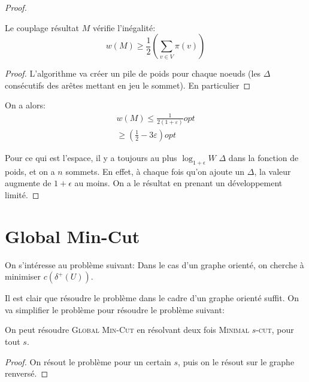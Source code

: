 \documentclass[math, info]{cours}
\begin{document}
\begin{proof}
	\begin{lemme}
		Le couplage résultat $M$ vérifie l'inégalité:
		\begin{equation*}
			w(M) \geq \frac{1}{2}\left(\sum_{v\in V}\pi(v) \right)
		\end{equation*}
	\end{lemme}
	\begin{proof}
		L'algorithme va créer un pile de poids pour chaque noeuds (les $\Delta$ consécutifs des arêtes mettant en jeu le sommet).
		En particulier
	\end{proof}

	On a alors:
	\begin{align*}
		w(M) \leq \frac{1}{2(1+\varepsilon)}opt \\
		\geq \left(\frac{1}{2} - 3\varepsilon \right)opt
	\end{align*}

	\medskip

	Pour ce qui est l'espace, il y a toujours au plus $\log_{1 + \epsilon}W$ $\Delta$ dans la fonction de poids, et on a $n$ sommets.
	En effet, à chaque fois qu'on ajoute un $\Delta$, la valeur augmente de $1 + \epsilon$ au moins.
	On a le résultat en prenant un développement limité.
\end{proof}


\section{Global Min-Cut}
On s'intéresse au problème suivant:
Dans le cas d'un graphe orienté, on cherche à minimiser $c\left(\delta^{+}(U)\right)$.

Il est clair que résoudre le problème dans le cadre d'un graphe orienté suffit.
On va simplifier le problème pour résoudre le problème suivant:

\begin{proposition}
	On peut résoudre \textsc{Global Min-Cut} en résolvant deux fois \textsc{Minimal $s$-cut}, pour tout $s$.
	\label{prop:minscut}
\end{proposition}
\begin{proof}
	On résout le problème pour un certain $s$, puis on le résout sur le graphe renversé.
\end{proof}
\end{document}
